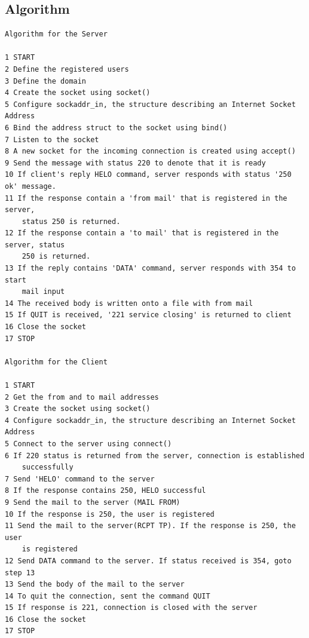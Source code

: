 \subsection{Algorithm}
\begin{verbatim}
Algorithm for the Server

1 START
2 Define the registered users
3 Define the domain
4 Create the socket using socket()
5 Configure sockaddr_in, the structure describing an Internet Socket Address
6 Bind the address struct to the socket using bind()
7 Listen to the socket
8 A new socket for the incoming connection is created using accept()
9 Send the message with status 220 to denote that it is ready
10 If client's reply HELO command, server responds with status '250 ok' message. 
11 If the response contain a 'from mail' that is registered in the server, 
    status 250 is returned. 
12 If the response contain a 'to mail' that is registered in the server, status 
    250 is returned.
13 If the reply contains 'DATA' command, server responds with 354 to start 
    mail input
14 The received body is written onto a file with from mail
15 If QUIT is received, '221 service closing' is returned to client
16 Close the socket
17 STOP

Algorithm for the Client

1 START
2 Get the from and to mail addresses
3 Create the socket using socket()
4 Configure sockaddr_in, the structure describing an Internet Socket Address
5 Connect to the server using connect()
6 If 220 status is returned from the server, connection is established 
    successfully
7 Send 'HELO' command to the server
8 If the response contains 250, HELO successful
9 Send the mail to the server (MAIL FROM)
10 If the response is 250, the user is registered
11 Send the mail to the server(RCPT TP). If the response is 250, the user
    is registered
12 Send DATA command to the server. If status received is 354, goto step 13
13 Send the body of the mail to the server
14 To quit the connection, sent the command QUIT
15 If response is 221, connection is closed with the server
16 Close the socket
17 STOP
\end{verbatim}

